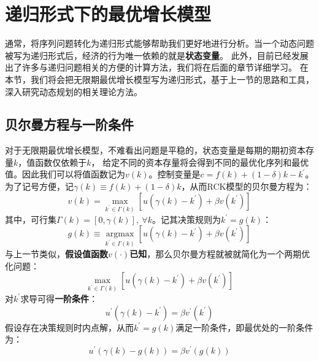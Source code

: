 
\section{递归形式下的最优增长模型}  \label{sec-rck-fe}

通常，将序列问题转化为递归形式能够帮助我们更好地进行分析。当一个动态问题被写为递归形式后，经济的行为唯一依赖的就是\textbf{状态变量}。
此外，目前已经发展出了许多与递归问题相关的方便的计算方法，我们将在后面的章节详细学习。
在本节，我们将会把无限期最优增长模型写为递归形式，基于上一节的思路和工具，深入研究动态规划的相关理论方法。


\subsection{贝尔曼方程与一阶条件} \label{subsec-rck-bellman-foc}

对于无限期最优增长模型，不难看出问题是平稳的，状态变量是每期的期初资本存量$k$，值函数仅依赖于$k$，
给定不同的资本存量将会得到不同的最优化序列和最优值。因此我们可以将值函数记为$v(k)$。控制变量是$c = f(k)+(1-\delta)k-k^{\prime}$。
为了记号方便，记$\gamma(k)\equiv f\left(k\right)+\left(1-\delta\right)k$，从而RCK模型的贝尔曼方程为：
\begin{equation}    \label{eq-rck-bellman}
    v\left(k\right) = \max _{k^{\prime}\in \Gamma(k)}
        \left[u\left(\gamma\left(k\right)-k^{\prime}\right)+\beta v\left(k^{\prime}\right)\right]
\end{equation}
其中，可行集$\Gamma(k) = \left[0,\gamma(k)\right],~\forall k$。记其决策规则为$k^{\prime}=g(k)$：
\begin{equation*}
    g\left(k\right) \equiv \underset{k^{\prime}\in\Gamma(k)}{\operatorname{argmax}}
        [u(\gamma\left(k\right)-k^{\prime})+\beta v\left(k^{\prime}\right)]
\end{equation*}
与上一节类似，\textbf{假设值函数$v\left(\cdot\right)$已知}，那么贝尔曼方程就被就简化为一个两期优化问题：
\begin{equation*}
    \max _{k^{\prime}\in\Gamma(k)}
        \left[u\left(\gamma\left(k\right)-k^{\prime}\right)+\beta v\left(k^{\prime}\right)\right]
\end{equation*}
对$k^{\prime}$求导可得\textbf{一阶条件}：
\begin{equation}    \label{eq-rck-bellman-foc}
    u^{\prime}\left(\gamma\left(k\right)-k^{\prime}\right) = \beta v^{\prime}\left(k^{\prime}\right)
\end{equation}
假设存在决策规则时内点解，从而$k^{\prime}=g(k)$满足一阶条件，即最优处的一阶条件为：
\begin{equation}    \label{eq-rck-bellman-foc-opt}
    u^{\prime}\left(\gamma(k)-g(k)\right) = \beta v^{\prime}\left(g(k)\right)
\end{equation}

